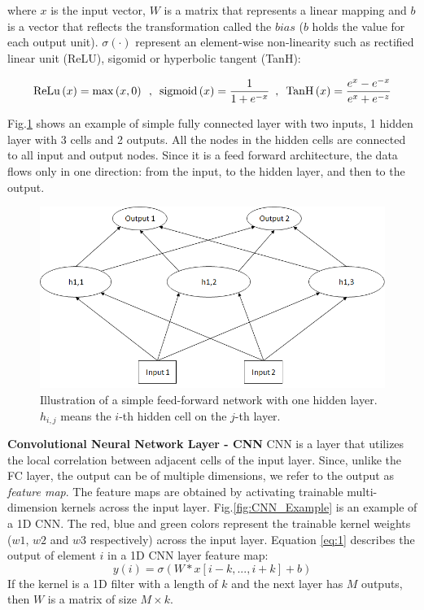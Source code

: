 \documentclass[
12pt, %
english, %
doublespacing, %
headsepline, %
]{MastersDoctoralThesis} %
\begin{document}
where $x$ is the input vector, $W$ is a matrix that represents a linear mapping and $b$ is a vector that reflects the transformation called the $bias$ ($b$ holds the value for each output unit). $\sigma \left( \cdot \right)$ represent an element-wise non-linearity such as rectified linear unit (ReLU), sigomid or hyperbolic tangent (TanH):

\[{\rm{ReLu}}\left( x \right) = \max \left( {x,0} \right) \,\,\,,\,\,\,{\rm{sigmoid}}\left( x \right) = \frac{1}{{1 + {e^{ - x}}}}\,\,\,,\,\,\,{\mathop{\rm Tan}\nolimits} {\rm{H}}\left( x \right) = \frac{{{e^x} - {e^{ - x}}}}{{{e^x} + {e^{ - z}}}}\]

Fig.\ref{fig:FF_Example} shows an example of simple fully connected layer with two inputs, 1 hidden layer with 3 cells and 2 outputs. All the nodes in the hidden cells are connected to all input and output nodes. Since it is a feed forward architecture, the data flows only in one direction: from the input, to the hidden layer, and then to the output.

\begin{figure}
\centering
\includegraphics[width=0.7\linewidth]{Figures/FF_Example_v2}
\caption{Illustration of a simple feed-forward network with one hidden layer. $h_{i,j}$ means the $i$-th hidden cell on the $j$-th layer. }
\label{fig:FF_Example}
\end{figure}

\textbf{Convolutional Neural Network Layer - CNN } CNN is a layer that utilizes the local correlation between adjacent cells of the input layer. Since, unlike the FC layer, the output can be of multiple dimensions, we refer to the output as \textit{feature map}. The feature maps are obtained by activating trainable multi-dimension kernels across the input layer. Fig.\ref{fig:CNN_Example} is an example of a 1D CNN. The red, blue and green colors represent the trainable kernel weights ($w1$, $w2$ and $w3$ respectively) across the input layer. Equation \ref{eq:1} describes the output of element $i$ in a 1D CNN layer feature map:
\begin{equation} \label{eq:1}
y\left( i \right) = \sigma \left( {W * x\left[ {i - k,...,i + k} \right] + b} \right)
\end{equation}
If the kernel is a 1D filter with a length of $k$ and the next layer has $M$ outputs, then $W$ is a matrix of size $M \times k$.
\end{document}
